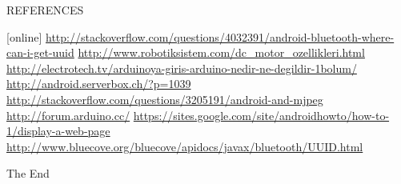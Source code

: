 \documentclass[xcolor=table, 9pt]{beamer}
\begin{document}


\begin{frame}{REFERENCES}
\begin{thebibliography}{9}
[online]
 {\scriptsize \url{http://stackoverflow.com/questions/4032391/android-bluetooth-where-can-i-get-uuid}}
 {\scriptsize \url{http://www.robotiksistem.com/dc_motor_ozellikleri.html}}
 {\scriptsize \url{http://electrotech.tv/arduinoya-giris-arduino-nedir-ne-degildir-1bolum/}}
 {\scriptsize \url{http://android.serverbox.ch/?p=1039}}
 {\scriptsize \url{http://stackoverflow.com/questions/3205191/android-and-mjpeg}}
 {\scriptsize \url{http://forum.arduino.cc/}}
 {\scriptsize \url{https://sites.google.com/site/androidhowto/how-to-1/display-a-web-page}}
 {\scriptsize \url{http://www.bluecove.org/bluecove/apidocs/javax/bluetooth/UUID.html}}

\end{thebibliography}
\end{frame}




\begin{frame}
\Huge{\centerline{The End}}
\end{frame}
\end{document}
